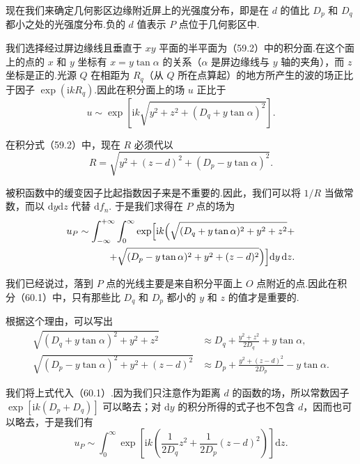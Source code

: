 现在我们来确定几何影区边缘附近屏上的光强度分布，即是在 $d$ 的值比 $D_p$ 和 $D_q$ 都小之处的光强度分布.负的 $d$ 值表示 $P$ 点位于几何影区中.

我们选择经过屏边缘线且垂直于 $xy$ 平面的半平面为（59.2）中的积分面.在这个面上的点的 $x$ 和 $y$ 坐标有 $x=y\tan\alpha$ 的关系（$\alpha$ 是屏边缘线与 $y$ 轴的夹角），而 $z$ 坐标是正的.光源 $Q$ 在相距为 $R_q$（从 $Q$ 所在点算起）的地方所产生的波的场正比于因子 $\exp(\mathrm{i}kR_q)$.因此在积分面上的场 $u$ 正比于
\begin{equation*}
  u\sim\exp\left[\mathrm{i}k\sqrt{y^2+z^2+(D_q+y\tan\alpha)^2}\right].
\end{equation*}

在积分式（59.2）中，现在 $R$ 必须代以
\begin{equation*}
  R=\sqrt{y^2+(z-d)^2+(D_p-y\tan\alpha)^2}.
\end{equation*}

被积函数中的缓变因子比起指数因子来是不重要的.因此，我们可以将 $1/R$ 当做常数，而以 $\mathrm{d}y\mathrm{d}z$ 代替 $\mathrm{d}f_n$. 于是我们求得在 $P$ 点的场为
\begin{equation}
\begin{aligned}
  u_P\sim\int_{-\infty}^{+\infty}\int_0^{\infty}
  \exp\Bigl[\mathrm{i}k\Bigl(\sqrt{(D_q+y\tan\alpha)^2+y^2+z^2}+\\
  +\sqrt{(D_p-y\tan\alpha)^2+y^2+(z-d)^2}\Bigr)\Bigr]\mathrm{d}y\,\mathrm{d}z.
\end{aligned}
\end{equation}

我们已经说过，落到 $P$ 点的光线主要是来自积分平面上 $O$ 点附近的点.因此在积分（60.1）中，只有那些比 $D_q$ 和 $D_p$ 都小的 $y$ 和 $z$ 的值才是重要的.

根据这个理由，可以写出
\begin{equation*}
\begin{aligned}
  \sqrt{(D_q+y\tan\alpha)^2+y^2+z^2}
  &\approx D_q+\frac{y^2+z^2}{2D_q}+y\tan\alpha,\\
  \sqrt{(D_p-y\tan\alpha)^2+y^2+(z-d)^2}
  &\approx D_p+\frac{y^2+(z-d)^2}{2D_p}-y\tan\alpha.
\end{aligned}
\end{equation*}

我们将上式代入（60.1）.因为我们只注意作为距离 $d$ 的函数的场，所以常数因子 $\exp[\mathrm{i}k(D_p+D_q)]$ 可以略去；对 $\mathrm{d}y$ 的积分所得的式子也不包含 $d$，因而也可以略去，于是我们有
\begin{equation*}
  u_P\sim\int_0^{\infty}\exp\left[
  \mathrm{i}k\left(\frac{1}{2D_q}z^2+\frac{1}{2D_p}(z-d)^2\right)\right]\mathrm{d}z.
\end{equation*}

